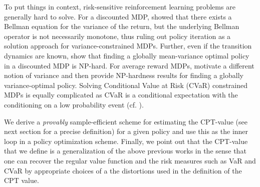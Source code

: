To put things in context, risk-sensitive reinforcement learning problems are generally hard to solve. 
For a discounted MDP, \citet{Sobel82VD} showed that there exists a Bellman equation for the variance of the return, but the underlying Bellman operator is not necessarily monotone, thus ruling out policy iteration as a solution approach for variance-constrained MDPs.
Further, even if the transition dynamics are known, \citet{mannor2013algorithmic} show that finding a globally mean-variance optimal policy in a discounted MDP is NP-hard.
For average reward MDPs, \citet{filar1989variance} motivate a different notion of variance and then provide NP-hardness results for finding a globally variance-optimal policy.
Solving Conditional Value at Risk (CVaR) constrained MDPs is equally complicated as CVaR is a conditional expectation with the conditioning on a low probability event (cf. \citealt{borkar2010risk,prashanth2014policy,tamar2014optimizing}). 


We derive a \textit{provably} sample-efficient  scheme for estimating the CPT-value (see next section for a precise definition) for a given policy and use this as the inner loop in a policy optimization scheme. 
Finally, we point out that the CPT-value that we define is a generalization of the above previous works in the sense that one can recover the regular value function and the risk measures such as VaR and CVaR by appropriate choices of a the distortions used in the definition of the CPT value.

